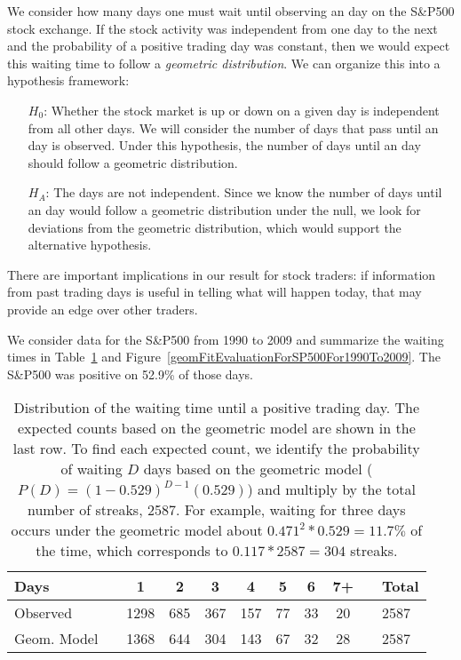 We consider how many days one must wait until observing an  day on the S\&P500 stock exchange. If the stock activity was independent from one day to the next and the probability of a positive trading day was constant, then we would expect this waiting time to follow a \emph{geometric distribution}. We can organize this into a hypothesis framework:
\begin{itemize}
\item[$H_0$:] Whether the stock market is up or down on a given day is independent from all other days. We will consider the number of days that pass until an  day is observed. Under this hypothesis, the number of days until an  day should follow a geometric distribution.
\item[$H_A$:] The days are not independent. Since we know the number of days until an  day would follow a geometric distribution under the null, we look for deviations from the geometric distribution, which would support the alternative hypothesis.
\end{itemize}
There are important implications in our result for stock traders: if information from past trading days is useful in telling what will happen today, that may provide an edge over other traders.

We consider data for the S\&P500 from 1990 to 2009 and summarize the waiting times in Table~\ref{sAndP500For1990To2009TimeToPosTrade2} and Figure~\ref{geomFitEvaluationForSP500For1990To2009}. The S\&P500 was positive on 52.9\% of those days.

\begin{table}
\centering
\begin{tabular}{ll ccc ccc c ll}
\hline
Days	 & \hspace{1mm} & 1 & 2 & 3 & 4 & 5 & 6 & 7+ & \hspace{1mm} & Total \\
\hline
Observed &		& 1298 & 685 & 367 & 157 & 77 & 33 & 20 & & 2587 \\
Geom. Model &		& 1368 & 644 & 304 & 143 & 67 & 32 & 28 & & 2587 \\
\hline
\end{tabular}
\caption{Distribution of the waiting time until a positive trading day. The expected counts based on the geometric model are shown in the last row. To find each expected count, we identify the probability of waiting $D$ days based on the geometric model ($P(D) = (1-0.529)^{D-1}(0.529)$) and multiply by the total number of streaks, 2587. For example, waiting for three days occurs under the geometric model about $0.471^2*0.529 = 11.7\%$ of the time, which corresponds to $0.117*2587 = 304$ streaks.}
\label{sAndP500For1990To2009TimeToPosTrade2}
\end{table}

